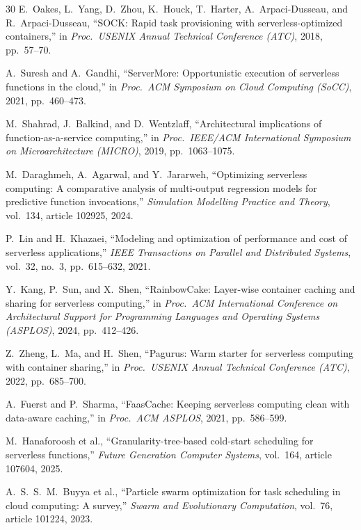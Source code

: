 \documentclass[final,5p,times,twocolumn]{elsarticle}
\begin{document}
\begin{thebibliography}{30}
E.~Oakes, L.~Yang, D.~Zhou, K.~Houck, T.~Harter, A.~Arpaci-Dusseau, and R.~Arpaci-Dusseau, ``SOCK: Rapid task provisioning with serverless-optimized containers,'' in \emph{Proc.\ USENIX Annual Technical Conference (ATC)}, 2018, pp.~57--70.

A.~Suresh and A.~Gandhi, ``ServerMore: Opportunistic execution of serverless functions in the cloud,'' in \emph{Proc.\ ACM Symposium on Cloud Computing (SoCC)}, 2021, pp.~460--473.

M.~Shahrad, J.~Balkind, and D.~Wentzlaff, ``Architectural implications of function-as-a-service computing,'' in \emph{Proc.\ IEEE/ACM International Symposium on Microarchitecture (MICRO)}, 2019, pp.~1063--1075.

M.~Daraghmeh, A.~Agarwal, and Y.~Jararweh, ``Optimizing serverless computing: A comparative analysis of multi-output regression models for predictive function invocations,'' \emph{Simulation Modelling Practice and Theory}, vol.~134, article 102925, 2024.

P.~Lin and H.~Khazaei, ``Modeling and optimization of performance and cost of serverless applications,'' \emph{IEEE Transactions on Parallel and Distributed Systems}, vol.~32, no.~3, pp.~615--632, 2021.

Y.~Kang, P.~Sun, and X.~Shen, ``RainbowCake: Layer-wise container caching and sharing for serverless computing,'' in \emph{Proc.\ ACM International Conference on Architectural Support for Programming Languages and Operating Systems (ASPLOS)}, 2024, pp.~412--426.

Z.~Zheng, L.~Ma, and H.~Shen, ``Pagurus: Warm starter for serverless computing with container sharing,'' in \emph{Proc.\ USENIX Annual Technical Conference (ATC)}, 2022, pp.~685--700.

A.~Fuerst and P.~Sharma, ``FaasCache: Keeping serverless computing clean with data-aware caching,'' in \emph{Proc.\ ACM ASPLOS}, 2021, pp.~586--599.

M.~Hanaforoosh et al., ``Granularity-tree-based cold-start scheduling for serverless functions,'' \emph{Future Generation Computer Systems}, vol.~164, article 107604, 2025.

A.~S.~S.~M.~Buyya et al., ``Particle swarm optimization for task scheduling in cloud computing: A survey,'' \emph{Swarm and Evolutionary Computation}, vol.~76, article 101224, 2023.


\end{thebibliography}
\end{document}
